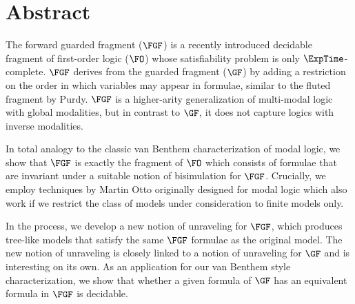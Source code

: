 \chapter*{Abstract}

\begingroup
\Large
\narrower
\narrower
The forward guarded fragment ($\FGF$) is a recently introduced decidable fragment of first-order logic ($\FO$) whose satisfiability problem is only $\ExpTime$-complete.
$\FGF$ derives from the guarded fragment ($\GF$) by adding a restriction on the order in which variables may appear in formulae, similar to the fluted fragment by Purdy.
$\FGF$ is a higher-arity generalization of multi-modal logic with global modalities, but in contrast to $\GF$, it does not capture logics with inverse modalities.

\baselineskip
\noindent
In total analogy to the classic van Benthem characterization of modal logic, we show that $\FGF$ is exactly the fragment of $\FO$ which consists of formulae that are invariant under a suitable notion of bisimulation for $\FGF$.
Crucially, we employ techniques by Martin Otto originally designed for modal logic which also work if we restrict the class of models under consideration to finite models only.

\baselineskip
\noindent
In the process, we develop a new notion of unraveling for $\FGF$, which produces tree-like models that satisfy the same $\FGF$ formulae as the original model.
The new notion of unraveling is closely linked to a notion of unraveling for $\GF$ and is interesting on its own.
As an application for our van Benthem style characterization, we show that whether a given formula of $\GF$ has an equivalent formula in $\FGF$ is decidable.

\endgroup
